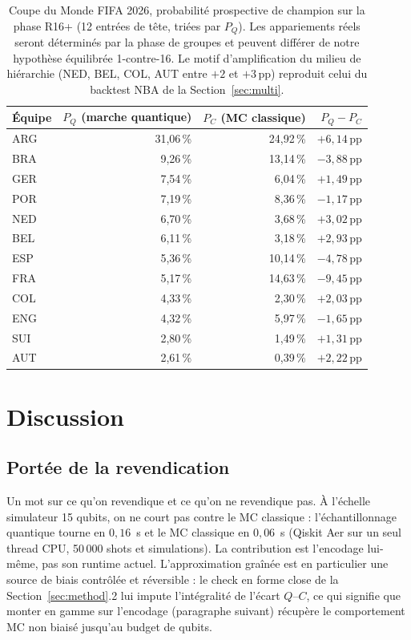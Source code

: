 \documentclass[11pt]{article}
\begin{document}
\begin{table}[!htbp]
\centering
\caption{Coupe du Monde FIFA 2026, probabilité prospective de champion
sur la phase R16+ (12 entrées de tête, triées par $P_Q$). Les
appariements réels seront déterminés par la phase de groupes et
peuvent différer de notre hypothèse équilibrée 1-contre-16. Le motif
d'amplification du milieu de hiérarchie (NED, BEL, COL, AUT entre
$+2$ et $+3$\,pp) reproduit celui du backtest NBA de la
Section~\ref{sec:multi}.}
\label{tab:wc}
\begin{tabular}{lrrr}
\toprule
Équipe & $P_Q$ (marche quantique) & $P_C$ (MC classique) & $P_Q - P_C$ \\
\midrule
ARG & 31,06\,\% & 24,92\,\% & $+6{,}14$\,pp \\
BRA & 9,26\,\% & 13,14\,\% & $-3{,}88$\,pp \\
GER & 7,54\,\% & 6,04\,\% & $+1{,}49$\,pp \\
POR & 7,19\,\% & 8,36\,\% & $-1{,}17$\,pp \\
NED & 6,70\,\% & 3,68\,\% & $+3{,}02$\,pp \\
BEL & 6,11\,\% & 3,18\,\% & $+2{,}93$\,pp \\
ESP & 5,36\,\% & 10,14\,\% & $-4{,}78$\,pp \\
FRA & 5,17\,\% & 14,63\,\% & $-9{,}45$\,pp \\
COL & 4,33\,\% & 2,30\,\% & $+2{,}03$\,pp \\
ENG & 4,32\,\% & 5,97\,\% & $-1{,}65$\,pp \\
SUI & 2,80\,\% & 1,49\,\% & $+1{,}31$\,pp \\
AUT & 2,61\,\% & 0,39\,\% & $+2{,}22$\,pp \\
\bottomrule
\end{tabular}
\end{table}

\section{Discussion}
\label{sec:discussion}

\subsection{Portée de la revendication}

Un mot sur ce qu'on revendique et ce qu'on ne revendique pas. À
l'échelle simulateur 15 qubits, on ne court pas contre le MC
classique : l'échantillonnage quantique tourne en $0{,}16$~s et le
MC classique en $0{,}06$~s (Qiskit Aer sur un seul thread CPU,
50\,000 shots et simulations). La contribution est l'encodage
lui-même, pas son runtime actuel. L'approximation graînée est en
particulier une source de biais contrôlée et réversible : le check en
forme close de la Section~\ref{sec:method}.2 lui impute l'intégralité
de l'écart $Q$--$C$, ce qui signifie que monter en gamme sur
l'encodage (paragraphe suivant) récupère le comportement MC non
biaisé jusqu'au budget de qubits.
\end{document}

